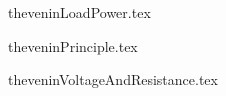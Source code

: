 \begin{frame}{theveninLoadPower.tex}
\begin{center}

\end{center}
\end{frame}

\begin{frame}{theveninPrinciple.tex}
\begin{center}

\end{center}
\end{frame}

\begin{frame}{theveninVoltageAndResistance.tex}
\begin{center}

\end{center}
\end{frame}


